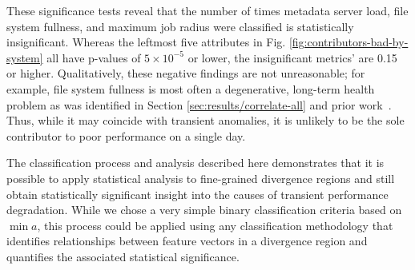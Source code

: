 These significance tests reveal that the number of times metadata server load, file system fullness, and maximum job radius were classified is statistically insignificant.
Whereas the leftmost five attributes in Fig. \ref{fig:contributors-bad-by-system} all have p-values of ${5 \times 10^{-5}}$ or lower, the insignificant metrics' are 0.15 or higher.
Qualitatively, these negative findings are not unreasonable; for example, file system fullness is most often a degenerative, long-term health problem as was identified in Section \ref{sec:results/correlate-all} and prior work~\cite{oral2014best,Lockwood2017}.
Thus, while it may coincide with transient anomalies, it is unlikely to be the sole contributor to poor performance on a single day.

The classification process and analysis described here demonstrates that it is possible to apply statistical analysis to fine-grained divergence regions and still obtain statistically significant insight into the causes of transient performance degradation.
While we chose a very simple binary classification criteria based on $\min{a}$, this process could be applied using any classification methodology that identifies relationships between feature vectors in a divergence region and quantifies the associated statistical significance.


\endinput

% 

\subsection {Discussion}
\label{sec:results/discussion}

\TODO{This is where interesting dribs and drabs are winding up.  Do we carve out a separate section about this stuff, or just drop it?}

Our choice of averaging $\textup{SMA}_{short}$ over ${-0.5w_{short} <= t < +0.5w_{short}}$ makes it insensitive to choice of $w_{short}$.
For the analysis in Section \ref{sec:features/timedependent} changing $\textup{SMA}_{short}$ from $\textup{w}_{14}$ to both $\textup{w}_{7}$ and $\textup{w}_{28}$ resulted in no change to the dates bounding the 139-day divergence region.
The principal effect of changing $\textup{w}_{short}$ is the number of short regions that arise from the higher-frequency oscillations of $\textup{SMA}_{short}$ around $\textup{SMA}_{long}$.


